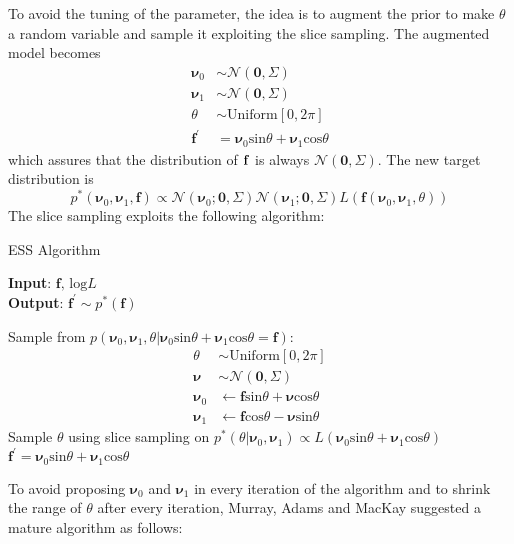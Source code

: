 \documentclass{article}
\begin{document}
To avoid the tuning of the parameter, the idea is to augment the prior to make $\theta$ a random variable and sample it exploiting the slice sampling. The augmented model becomes
\begin{align*}
\pmb{\nu}_0&\sim\mathcal{N}(\mathbf{0},\Sigma)\\
\pmb{\nu}_1&\sim\mathcal{N}(\mathbf{0},\Sigma)\\
\theta&\sim \text{Uniform}[0,2\pi]\\
\mathbf{f^{'}}&=\pmb{\nu}_0\text{sin}\theta+\pmb{\nu}_1\text{cos}\theta
\end{align*}
which assures that the distribution of $\bf{f}$ is always $\mathcal{N}(\mathbf{0},\Sigma)$. The new target distribution is $$p^*(\pmb{\nu}_0,\pmb{\nu}_1,\mathbf{f})\propto\mathcal{N}(\pmb{\nu}_0;\mathbf{0},\Sigma)\mathcal{N}(\pmb{\nu}_1;\mathbf{0},\Sigma)L(\mathbf{f}(\pmb{\nu}_0,\pmb{\nu}_1,\theta))$$
The slice sampling exploits the following algorithm:\\

\begin{algorithm}
\caption{ESS Algorithm}\label{ess}
\hspace*{\algorithmicindent} \textbf{Input}: $\mathbf{f},\,\text{log}L$ \\
\hspace*{\algorithmicindent} \textbf{Output}: $\mathbf{f^'}\sim p^*(\mathbf{f})$ 
\begin{algorithmic}[1]
  \State Sample from $p(\pmb{\nu}_0,\pmb{\nu}_1,\theta|\pmb{\nu}_0\text{sin}\theta+\pmb{\nu}_1\text{cos}\theta=\mathbf{f})$:
\begin{align*}
\theta &\sim\text{Uniform}[0,2\pi]\\
\pmb{\nu}&\sim\mathcal{N}(\mathbf{0},\Sigma)\\ 
\pmb{\nu}_0 &\leftarrow\mathbf{f}\text{sin}\theta+\pmb{\nu}\text{cos}\theta\\
\pmb{\nu}_1 &\leftarrow\mathbf{f}\text{cos}\theta-\pmb{\nu}\text{sin}\theta
\end{align*}
  \State Sample $\theta$ using slice sampling on $p^*(\theta|\pmb{\nu}_0,\pmb{\nu}_1)\propto L(\pmb{\nu}_0\text{sin}\theta+\pmb{\nu}_1\text{cos}\theta)$ 
  \State $\mathbf{f^{'}}=\pmb{\nu}_0\text{sin}\theta+\pmb{\nu}_1\text{cos}\theta$
\end{algorithmic}
\end{algorithm}

To avoid proposing $\pmb{\nu}_{0}$ and $\pmb{\nu}_{1}$ in every iteration of the algorithm and to shrink the range of $\theta$ after every iteration, Murray, Adams and MacKay \cite{MAM} 
suggested a mature algorithm as follows:
\end{document}
